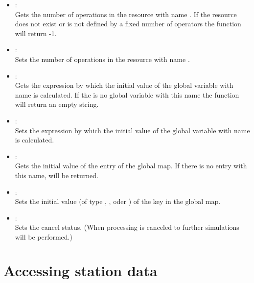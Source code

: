 \begin{itemize}
\item
{}:\\
Gets the number of operations in the resource with name .
If the resource does not exist or is not defined by a fixed number of operators
the function will return -1.

\item
{}:\\
Sets the number of operations in the resource with name .

\item
{}:\\
Gets the expression by which the initial value of the global variable with
name  is calculated. If the is no global variable with
this name the function will return an empty string.

\item
{}:\\
Sets the expression by which the initial value of the global variable with
name  is calculated.

\item
{}:\\
Gets the initial value of the entry  of the global map.
If there is no entry with this name,  will be returned.

\item
{}:\\
Sets the initial value (of type , ,  oder ) of the key 
in the global map.

\item
{}:\\
Sets the cancel status. (When processing is canceled to further simulations will be performed.)

\end{itemize}

\section{Accessing station data}

